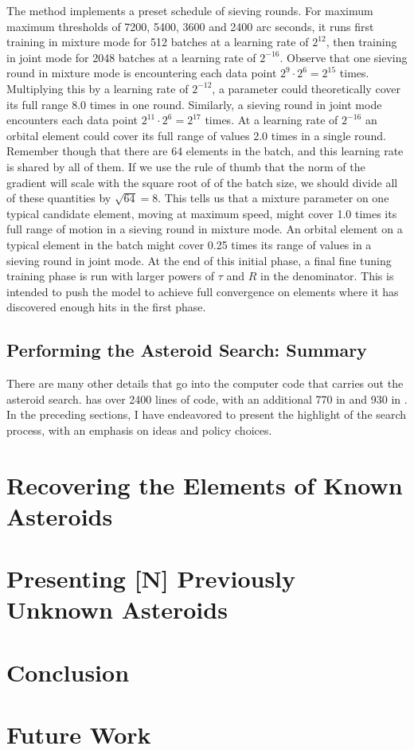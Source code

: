 The method  implements a preset schedule of sieving rounds.
For maximum maximum thresholds of 7200, 5400, 3600 and 2400 arc seconds, 
it runs first training in mixture mode for 512 batches at a learning rate of $2^{12}$, 
then training in joint mode for 2048 batches at a learning rate of $2^{-16}$.
Observe that one sieving round in mixture mode is encountering each data point $2^{9} \cdot 2^{6} = 2^{15}$ times.
Multiplying this by a learning rate of $2^{-12}$, a parameter could theoretically cover its full range 8.0 times in one round.
Similarly, a sieving round in joint mode encounters each data point $2^{11} \cdot 2^{6} = 2^{17}$ times.
At a learning rate of $2^{-16}$ an orbital element could cover its full range of values 2.0 times in a single round.
Remember though that there are 64 elements in the batch, and this learning rate is shared by all of them.
If we use the rule of thumb that the norm of the gradient will scale with the square root of of the batch size,
we should divide all of these quantities by $\sqrt{64} = 8$.
This tells us that a mixture parameter on one typical candidate element, moving at maximum speed,
might cover 1.0 times its full range of motion in a sieving round in mixture mode.
An orbital element on a typical element in the batch might cover 0.25 times its range of values
in a sieving round in joint mode.
At the end of this initial phase, a final fine tuning training phase is run with larger powers of $\tau$ and $R$ in the denominator.
This is intended to push the model to achieve full convergence on elements where it has discovered enough hits in the first phase.

\subsection{Performing the Asteroid Search: Summary}
There are many other details that go into the computer code that carries out the asteroid search.
 has over 2400 lines of code, with an additional 770 in  and 930 in .
In the preceding sections, I have endeavored to present the highlight of the search process, with an emphasis on ideas and policy choices.

\section{Recovering the Elements of Known Asteroids}
\label{section_results_known_ast}

\section{Presenting [N] Previously Unknown Asteroids}
\label{section_results_unknown_ast}

\section{Conclusion}
\label{search_conclusion}

\section{Future Work}
\label{section_future_work}

